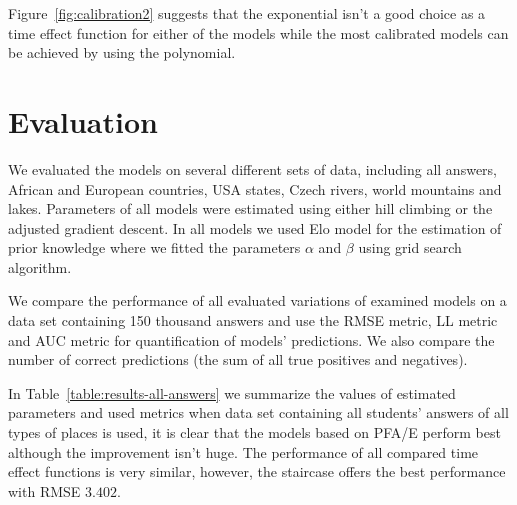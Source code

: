 Figure~\ref{fig:calibration2} suggests that the exponential isn't a good choice as a time effect function for either of the models while the most calibrated models can be achieved by using the polynomial.

\section{Evaluation}
\label{evaluation}

We evaluated the models on several different sets of data, including all answers, African and European countries, USA states, Czech rivers, world mountains and lakes. Parameters of all models were estimated using either hill climbing or the adjusted gradient descent. In all models we used Elo model for the estimation of prior knowledge where we fitted the parameters $\alpha$ and $\beta$ using grid search algorithm.

We compare the performance of all evaluated variations of examined models on a data set containing 150 thousand answers and use the RMSE metric, LL metric and AUC metric for quantification of models' predictions. We also compare the number of correct predictions (the sum of all true positives and negatives).

In Table~\ref{table:results-all-answers} we summarize the values of estimated parameters and used metrics when data set containing all students' answers of all types of places is used, it is clear that the models based on PFA/E perform best although the improvement isn't huge. The performance of all compared time effect functions is very similar, however, the staircase offers the best performance with RMSE $3.402$.

